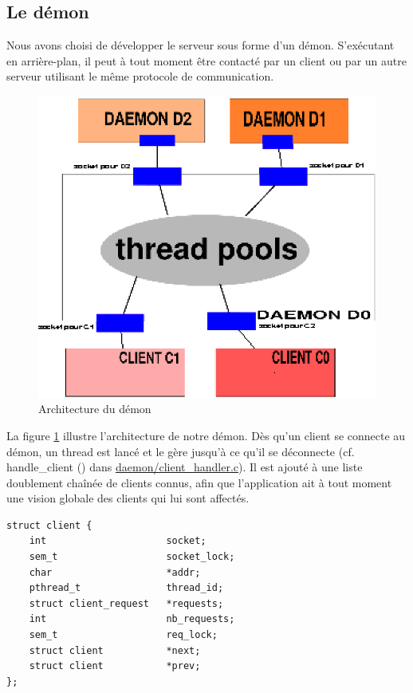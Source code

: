 	
\subsection{Le démon}

    Nous avons choisi de développer le serveur sous forme d'un démon.
S'exécutant en arrière-plan, il peut à tout moment être contacté par un client
ou par un autre serveur utilisant le même protocole de communication.

 \begin{center}
\begin{figure}[htbp]
    \centering
    \includegraphics[scale=1]{archi_daemon.eps}
    \caption{Architecture du démon}
    \label{demon}
\end{figure}
\end{center}

   La figure \ref{demon} illustre l'architecture de notre démon.
    Dès qu'un client se connecte au démon, un thread est lancé et le gère
jusqu'à ce qu'il se déconnecte (cf. handle\_client () dans
\url{daemon/client_handler.c}). Il est ajouté à une liste doublement chaînée de
 clients connus, afin que l'application ait à tout moment une vision globale 
des clients qui lui sont affectés. 

\begin{lstlisting}
struct client {
    int                     socket;
    sem_t                   socket_lock;
    char                    *addr;
    pthread_t               thread_id;
    struct client_request   *requests;
    int                     nb_requests;
    sem_t                   req_lock;
    struct client           *next;
    struct client           *prev;
};
\end{lstlisting}

